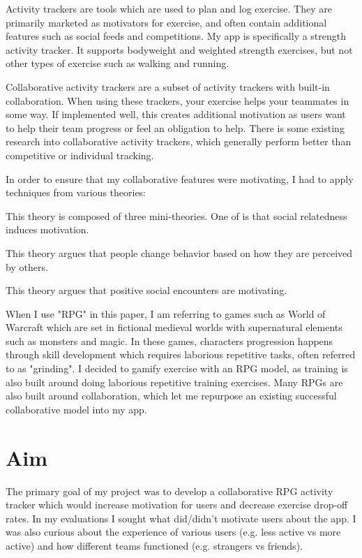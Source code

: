 \documentclass{l4proj}
\begin{document}
Activity trackers are tools which are used to plan and log exercise. They are primarily marketed as motivators for exercise, and often contain additional features such as social feeds and competitions. My app is specifically a strength activity tracker. It supports bodyweight and weighted strength exercises, but not other types of exercise such as walking and running. 

Collaborative activity trackers are a subset of activity trackers with built-in collaboration. When using these trackers, your exercise helps your teammates in some way. If implemented well, this creates additional motivation as users want to help their team progress or feel an obligation to help. There is some existing research into collaborative activity trackers, which generally perform better than competitive or individual tracking.

In order to ensure that my collaborative features were motivating, I had to apply techniques from various theories:

This theory is composed of three mini-theories. One of is that social relatedness induces motivation. 

This theory argues that people change behavior based on how they are perceived by others. 

This theory argues that positive social encounters are motivating. 

When I use "RPG" in this paper, I am referring to games such as World of Warcraft which are set in fictional medieval worlds with supernatural elements such as monsters and magic. In these games, characters progression happens through skill development which requires laborious repetitive tasks, often referred to as "grinding". I decided to gamify exercise with an RPG model, as training is also built around doing laborious repetitive training exercises. Many RPGs are also built around collaboration, which let me repurpose an existing successful collaborative model into my app. 

\section{Aim}
The primary goal of my project was to develop a collaborative RPG activity tracker which would increase motivation for users and decrease exercise drop-off rates. In my evaluations I sought what did/didn't motivate users about the app. I was also curious about the experience of various users (e.g. less active vs more active) and how different teams functioned (e.g. strangers vs friends).  
\end{document}

